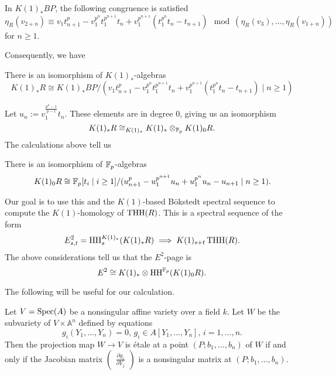 \begin{lem}
	In $K(1)_*BP$, the following congruence is satisfied
	\[
	\eta_R(v_{2+n})\equiv v_1t_{n+1}^p-v_1^{p^n}t_1^{p^{n+1}}t_n+v_1^{p^{n+1}}(t_1^{p^n}t_n-t_{n+1})  \mod(\eta_R(v_3), \ldots, \eta_R(v_{1+n}))
	\]
	for $n\geq 1$.
\end{lem}


Consequently, we have 

\begin{cor}
	There is an isomorphism of $K(1)_*$-algebras
	\[
	K(1)_*R\cong K(1)_*BP/(v_1t_{n+1}^p-v_1^{p^n}t_1^{p^{n+1}}t_n+v_1^{p^{n+1}}(t_1^{p^n}t_n-t_{n+1}) \mid n\geq 1)
	\]
\end{cor}

Let $u_n:=v_1^{\frac{p^n-1}{p-1}}t_n$. These elements are in degree 0, giving us an isomorphism
\[
K(1)_*R\cong_{K(1)_*}K(1)_*\otimes_{\mathbb{F}_p}K(1)_0R.
\]
The calculations above tell us 

\begin{cor}
	There is an isomorphism of $\mathbb{F}_p$-algebras
	\[
	K(1)_0 R\cong\mathbb{F}_p[t_i\mid i\geq 1]/(u_{n+1}^p-u_1^{p^{n+1}}u_n+u_1^{p^n}u_n-u_{n+1}\mid n\geq 1).
	\]
\end{cor}

Our goal is to use this and the $K(1)$-based B\"okstedt spectral sequence to compute the $K(1)$-homology of $\operatorname{THH}(R)$. This is a spectral sequence of the form 
\[
E^2_{s,t}= \operatorname{HH}^{K(1)_*}_s(K(1)_*R)\implies K(1)_{s+t}\operatorname{THH}(R).
\]
The above considerations tell us that the $E^2$-page is 
\[
E^2\cong K(1)_*\otimes \operatorname{HH}^{\mathbb{F}_p}(K(1)_0R). 
\]

The following will be useful for our calculation.

\begin{lem}\label{lem:etale}
	Let $V = \operatorname{Spec}(A)$ be a nonsingular affine variety over a field $k$. Let $W$ be the subvariety of $V\times \mathbb{A}^n$ defined by equations
	\[
	g_i(Y_1, \ldots, Y_n)=0, \, g_i\in A[Y_1, \ldots, Y_n],\, i=1,\ldots , n.
	\]
	Then the projection map $W\to V$ is \'etale at a point $(P;b_1, \ldots, b_n)$ of $W$ if and only if the Jacobian matrix $\begin{pmatrix}
		\frac{\partial g_i}{\partial Y_j}
	\end{pmatrix}$ is a nonsingular matrix at $(P; b_1, \ldots , b_n)$.
\end{lem} 

